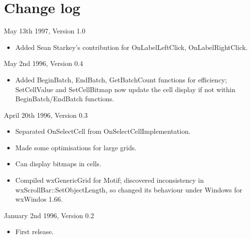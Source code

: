 \chapter{Change log}\label{changes}
%
\setfooter{\thepage}{}{}{}{}{\thepage}%

May 13th 1997, Version 1.0

\begin{itemize}\itemsep=0pt
\item Added Sean Starkey's contribution for OnLabelLeftClick, OnLabelRightClick.
\end{itemize}

May 2nd 1996, Version 0.4

\begin{itemize}\itemsep=0pt
\item Added BeginBatch, EndBatch, GetBatchCount functions for efficiency;
SetCellValue and SetCellBitmap now update the cell display if not within
BeginBatch/EndBatch functions.
\end{itemize}

April 20th 1996, Version 0.3

\begin{itemize}\itemsep=0pt
\item Separated OnSelectCell from OnSelectCellImplementation.
\item Made some optimisations for large grids.
\item Can display bitmaps in cells.
\item Compiled wxGenericGrid for Motif; discovered inconsistency
in wxScrollBar::SetObjectLength, so changed its behaviour under Windows
for wxWindos 1.66.
\end{itemize}

January 2nd 1996, Version 0.2

\begin{itemize}\itemsep=0pt
\item First release.
\end{itemize}

